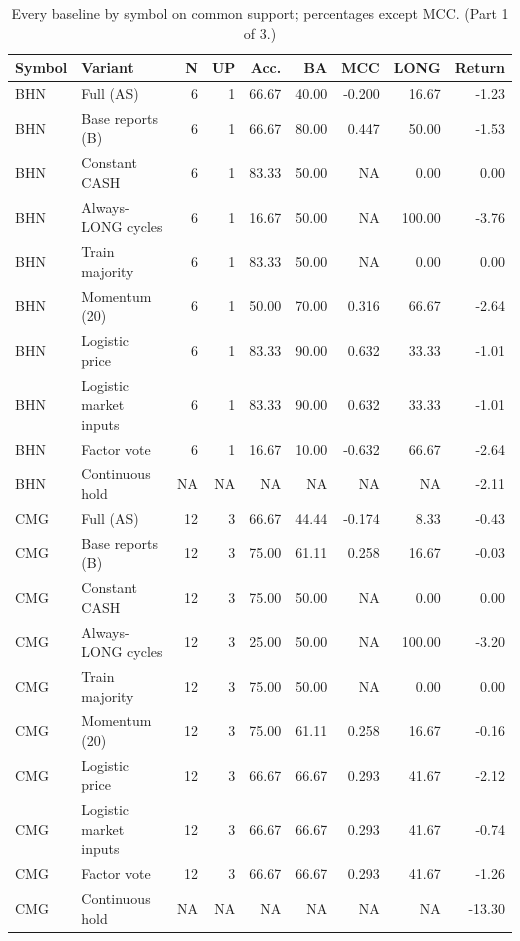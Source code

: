 \begin{table}[htbp]
\centering\small
\caption{Every baseline by symbol on common support; percentages except MCC. (Part 1 of 3.)}
\label{tab:r1_common_symbols}
\setlength{\tabcolsep}{3.5pt}
\begin{tabular}{llrrrrrrr}
\hline
Symbol & Variant & N & UP & Acc. & BA & MCC & LONG & Return \\
\hline
BHN & Full (AS) & 6 & 1 & 66.67 & 40.00 & -0.200 & 16.67 & -1.23 \\
BHN & Base reports (B) & 6 & 1 & 66.67 & 80.00 & 0.447 & 50.00 & -1.53 \\
BHN & Constant CASH & 6 & 1 & 83.33 & 50.00 & NA & 0.00 & 0.00 \\
BHN & Always-LONG cycles & 6 & 1 & 16.67 & 50.00 & NA & 100.00 & -3.76 \\
BHN & Train majority & 6 & 1 & 83.33 & 50.00 & NA & 0.00 & 0.00 \\
BHN & Momentum (20) & 6 & 1 & 50.00 & 70.00 & 0.316 & 66.67 & -2.64 \\
BHN & Logistic price & 6 & 1 & 83.33 & 90.00 & 0.632 & 33.33 & -1.01 \\
BHN & Logistic market inputs & 6 & 1 & 83.33 & 90.00 & 0.632 & 33.33 & -1.01 \\
BHN & Factor vote & 6 & 1 & 16.67 & 10.00 & -0.632 & 66.67 & -2.64 \\
BHN & Continuous hold & NA & NA & NA & NA & NA & NA & -2.11 \\
CMG & Full (AS) & 12 & 3 & 66.67 & 44.44 & -0.174 & 8.33 & -0.43 \\
CMG & Base reports (B) & 12 & 3 & 75.00 & 61.11 & 0.258 & 16.67 & -0.03 \\
CMG & Constant CASH & 12 & 3 & 75.00 & 50.00 & NA & 0.00 & 0.00 \\
CMG & Always-LONG cycles & 12 & 3 & 25.00 & 50.00 & NA & 100.00 & -3.20 \\
CMG & Train majority & 12 & 3 & 75.00 & 50.00 & NA & 0.00 & 0.00 \\
CMG & Momentum (20) & 12 & 3 & 75.00 & 61.11 & 0.258 & 16.67 & -0.16 \\
CMG & Logistic price & 12 & 3 & 66.67 & 66.67 & 0.293 & 41.67 & -2.12 \\
CMG & Logistic market inputs & 12 & 3 & 66.67 & 66.67 & 0.293 & 41.67 & -0.74 \\
CMG & Factor vote & 12 & 3 & 66.67 & 66.67 & 0.293 & 41.67 & -1.26 \\
CMG & Continuous hold & NA & NA & NA & NA & NA & NA & -13.30 \\

\end{tabular}
\end{table}
